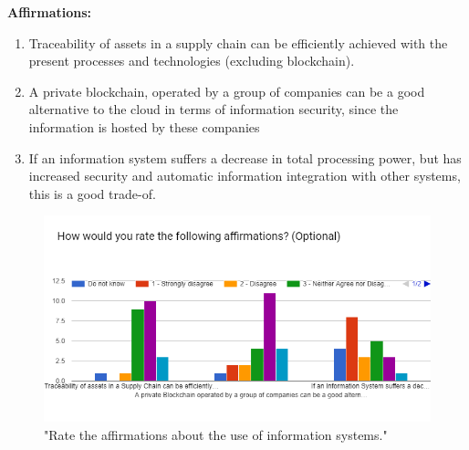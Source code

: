 \textbf{Affirmations: }
\begin{enumerate}
\item Traceability of assets in a supply
chain can be efficiently achieved
with the present processes and
technologies (excluding blockchain).
\item A private blockchain, operated by a group
of companies can be a good alternative to 
the cloud in terms of information security,
since the information is hosted by these
companies
\item If an information system suffers a 
decrease in total processing power, but
has increased security and automatic
information integration with other
systems, this is a good trade-of.
\end{enumerate}


\begin{figure}[h]
\centering
\includegraphics[scale=0.60]{media/affirmations_SC_info_systems.png}
\caption["Rate the affirmations about the use of information systems."]{"Rate the affirmations about the use of information systems."}
\label{fig:affirmations_SC_info_systems}
\end{figure}


